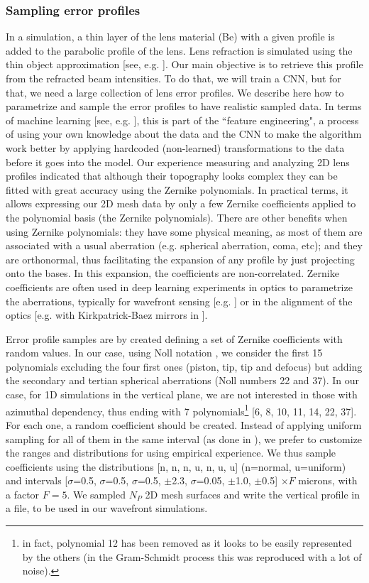 \documentclass[preprint]{iucr}
\begin{document}
\subsubsection{Sampling error profiles}
In a simulation, a thin layer of the lens material (Be) with a given profile is added to the parabolic profile of the lens. Lens refraction is simulated using the thin object approximation [see, e.g. \cite{multioptics, Celestre:yi5119}]. Our main objective is to retrieve this profile from the refracted beam intensities. To do that, we will train a CNN, but for that, we need a large collection of lens error profiles. We describe here how to parametrize and sample the error profiles to have realistic sampled data. In terms of machine learning [see, e.g. \cite{chollet_book}], this is part of the ``feature engineering", a process of using your own knowledge about the data and the CNN to make the algorithm work better by applying hardcoded (non-learned) transformations to the data before it goes into the model.
Our experience measuring and analyzing 2D lens profiles indicated that although their topography looks complex they can be fitted with great accuracy using the Zernike polynomials. In practical terms, it allows expressing our 2D mesh data by only a few Zernike coefficients applied to the polynomial basis (the Zernike polynomials). There are other benefits when using Zernike polynomials: they have some physical meaning, as most of them are associated with a usual aberration (e.g. spherical aberration, coma, etc); and they are orthonormal, thus facilitating the expansion of any profile by just projecting onto the bases. In this expansion, the coefficients are non-correlated. Zernike coefficients are often used in deep learning experiments in optics to parametrize the aberrations, typically for wavefront sensing [e.g. \cite{Saha2020}] or in the alignment of the optics [e.g. with Kirkpatrick-Baez mirrors in \cite{Luiz2022}]. 

Error profile samples are by created defining a set of Zernike coefficients with random values. In our case, using Noll notation \cite{Noll:76}, we consider the first 15 polynomials excluding the four first ones (piston, tip, tip and defocus) but adding the secondary and tertian spherical aberrations (Noll numbers 22 and 37). In our case, for 1D simulations in the vertical plane, we are not interested in those with azimuthal dependency, thus ending with 7 polynomials\footnote{in fact, polynomial 12 has been removed as it looks to be easily represented by the others (in the Gram-Schmidt process this was reproduced with a lot of noise). } [6, 8, 10, 11, 14, 22, 37]. For each one, a random coefficient should be created. Instead of applying uniform sampling for all of them in the same interval (as done in \cite{Saha2020}), we prefer to customize the ranges and distributions for using empirical experience. We thus sample coefficients using the distributions [n, n, n, u, n, u, u]  (n=normal, u=uniform) and intervals [$\sigma$=0.5, $\sigma$=0.5, $\sigma$=0.5, $\pm$2.3, $\sigma$=0.05, $\pm$1.0, $\pm$0.5] $\times F$ microns, with a factor $F=5$. We sampled $N_P$ 2D mesh surfaces and write the vertical profile in a file, to be used in our wavefront simulations.
\end{document}
